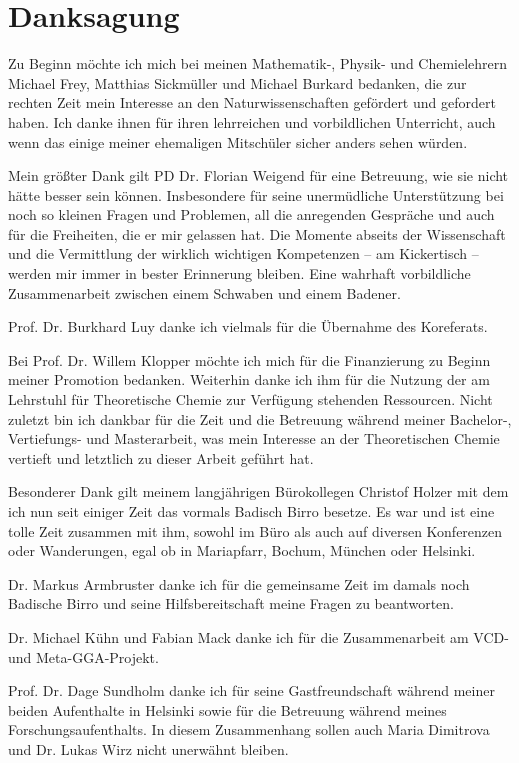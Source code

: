 \chapter*{Danksagung}
Zu Beginn möchte ich mich bei meinen Mathematik-, Physik- und Chemielehrern Michael Frey, Matthias Sickmüller und Michael Burkard bedanken, die zur rechten Zeit mein Interesse an den Naturwissenschaften gefördert und gefordert haben. Ich danke ihnen für ihren lehrreichen und vorbildlichen Unterricht, auch wenn das einige meiner ehemaligen Mitschüler sicher anders sehen würden.

\bigskip
Mein größter Dank gilt PD Dr. Florian Weigend für eine Betreuung, wie sie nicht hätte besser sein können. Insbesondere für seine unermüdliche Unterstützung bei noch so kleinen Fragen und Problemen, all die anregenden Gespräche und auch für die Freiheiten, die er mir gelassen hat. Die Momente abseits der Wissenschaft und die Vermittlung der wirklich wichtigen Kompetenzen -- am Kickertisch -- werden mir immer in bester Erinnerung bleiben. Eine wahrhaft vorbildliche Zusammenarbeit zwischen einem Schwaben und einem Badener.

\bigskip
Prof. Dr. Burkhard Luy danke ich vielmals für die Übernahme des Koreferats.

\bigskip
Bei Prof. Dr. Willem Klopper möchte ich mich für die Finanzierung zu Beginn meiner Promotion bedanken. Weiterhin danke ich ihm für die Nutzung der am Lehrstuhl für Theoretische Chemie zur Verfügung stehenden Ressourcen. Nicht zuletzt bin ich dankbar für die Zeit und die Betreuung während meiner Bachelor-, Vertiefungs- und Masterarbeit, was mein Interesse an der Theoretischen Chemie vertieft und letztlich zu dieser Arbeit geführt hat.

\bigskip
Besonderer Dank gilt meinem langjährigen Bürokollegen Christof Holzer mit dem ich nun seit einiger Zeit das \glqq vormals Badisch Birro\grqq{} besetze. Es war und ist eine tolle Zeit zusammen mit ihm, sowohl im Büro als auch auf diversen Konferenzen oder Wanderungen, egal ob in Mariapfarr, Bochum, München oder Helsinki.

\bigskip
Dr. Markus Armbruster danke ich für die gemeinsame Zeit im damals noch \glqq Badische Birro\grqq{} und seine Hilfsbereitschaft meine Fragen zu beantworten. 

Dr. Michael Kühn und Fabian Mack danke ich für die Zusammenarbeit am VCD- und Meta-GGA-Projekt.  

\bigskip
Prof. Dr. Dage Sundholm danke ich für seine Gastfreundschaft während meiner beiden Aufenthalte in Helsinki sowie für die Betreuung während meines Forschungsaufenthalts. In diesem Zusammenhang sollen auch Maria Dimitrova und Dr. Lukas Wirz nicht unerwähnt bleiben.

